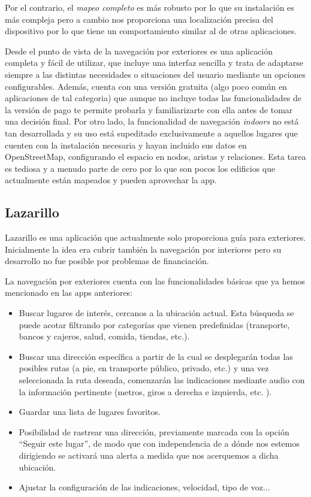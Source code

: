 Por el contrario, el \textit{mapeo completo} es más robusto por lo que su instalación es más compleja pero a cambio nos proporciona una localización precisa del dispositivo por lo que tiene un comportamiento similar al de otras aplicaciones.

Desde el punto de vista de la navegación por exteriores es una aplicación completa y fácil de utilizar, que incluye una interfaz sencilla y trata de adaptarse siempre a las distintas necesidades o situaciones del usuario mediante un opciones configurables. Además, cuenta con una versión gratuita (algo poco común en aplicaciones de tal categoria) que aunque no incluye todas las funcionalidades de la versión de pago te permite probarla y familiarizarte con ella antes de tomar una decisión final. Por otro lado, la funcionalidad de navegación \textit{indoors} no está tan desarrollada y su uso está supeditado exclusivamente a aquellos lugares que cuenten con la instalación necesaria y hayan incluido sus datos en OpenStreetMap, configurando el espacio en nodos, aristas y relaciones. Esta tarea es tediosa y a menudo parte de cero por lo que son pocos los edificios que actualmente están mapeados y pueden aprovechar la app.

\subsection{Lazarillo}
Lazarillo \citep{lazarilloOnline} es una aplicación que actualmente solo proporciona guía para exteriores. Inicialmente la idea era cubrir también la navegación por interiores pero su desarrollo no fue posible por problemas de financiación.

La navegación por exteriores cuenta con las funcionalidades básicas que ya hemos mencionado en las apps anteriores: \begin{itemize}
	\item Buscar lugares de interés, cercanos a la ubicación actual. Esta búsqueda se puede acotar filtrando por categorías que vienen predefinidas (transporte, bancos y cajeros, salud, comida, tiendas, etc.).
	\item Buscar una dirección específica a partir de la cual se desplegarán todas las posibles rutas (a pie, en transporte público, privado, etc.) y una vez seleccionada la ruta deseada, comenzarán las indicaciones mediante audio con la información pertinente (metros, giros a derecha e izquierda, etc. ). 
	\item Guardar una lista de lugares favoritos.
	\item Posibilidad de rastrear una dirección, previamente marcada con la opción ``Seguir este lugar'', de modo que con independencia de a dónde nos estemos dirigiendo se activará una alerta a medida que nos acerquemos a dicha ubicación.
	\item Ajustar la configuración de las indicaciones, velocidad, tipo de voz...
\end{itemize}

